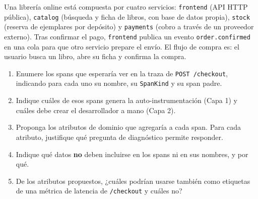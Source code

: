 \documentclass[variant=guia,cover=institutional,mode=screen]{ua-engineering-v6-article}
\begin{document}
\begin{uaexercise}
Una librería online está compuesta por cuatro servicios: \texttt{frontend} (API HTTP pública), \texttt{catalog} (búsqueda y ficha de libros, con base de datos propia), \texttt{stock} (reserva de ejemplares por depósito) y \texttt{payments} (cobro a través de un proveedor externo). Tras confirmar el pago, \texttt{frontend} publica un evento \texttt{order.confirmed} en una cola para que otro servicio prepare el envío. El flujo de compra es: el usuario busca un libro, abre su ficha y confirma la compra.
\begin{enumerate}
\item Enumere los spans que esperaría ver en la traza de \texttt{POST /checkout}, indicando para cada uno su nombre, su \texttt{SpanKind} y su span padre.
\item Indique cuáles de esos spans genera la auto-instrumentación (Capa 1) y cuáles debe crear el desarrollador a mano (Capa 2).
\item Proponga los atributos de dominio que agregaría a cada span. Para cada atributo, justifique qué pregunta de diagnóstico permite responder.
\item Indique qué datos \textbf{no} deben incluirse en los spans ni en sus nombres, y por qué.
\item De los atributos propuestos, ¿cuáles podrían usarse también como etiquetas de una métrica de latencia de \texttt{/checkout} y cuáles no?
\end{enumerate}
\end{uaexercise}
\end{document}
